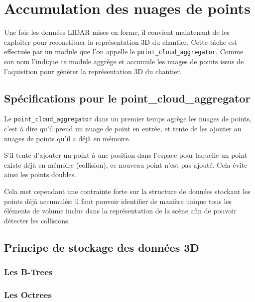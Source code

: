 \documentclass[12pt,a4paper]{report}
\begin{document}
		
	\section{Accumulation des nuages de points}
	
	Une fois les données LIDAR mises en forme, il convient maintenant de les exploiter pour reconstituer la représentation 3D du chantier. Cette tâche est effectuée par un module que l'on appelle le \verb|point_cloud_aggregator|. Comme son nom l'indique ce module aggrège et accumule les nuages de points issus de l'aquisition pour générer la représentation 3D du chantier.
	
		\subsection{Spécifications pour le point\_cloud\_aggregator}
		Le \verb|point_cloud_aggregator| dans un premier temps agrège les nuages de points, c'est à dire qu'il prend un nuage de point en entrée, et tente de les ajouter au nuages de points qu'il a déjà en mémoire. 
		
		\para S'il tente d'ajouter un point à une position dans l'espace pour laquelle un point existe déjà en mémoire (collision), ce nouveau point n'est pas ajouté. Cela évite ainsi les points doubles.
		
		\para Cela met cependant une contrainte forte sur la structure de données stockant les points déjà accumulés: il faut pouvoir identifier de manière unique tous les éléments de volume inclus dans la représentation de la scène afin de pouvoir détecter les collisions.
		
		\cite{shekhar_encyclopedia_2017}
		
		\subsection{Principe de stockage des données 3D}
		
		\subsubsection{Les B-Trees}
		
		\subsubsection{Les Octrees}
		
\end{document}
